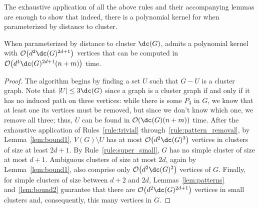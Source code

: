 The exhaustive application of all the above rules and their accompanying lemmas are enough to show that indeed, there is a polynomial kernel for  when parameterized by distance to cluster.


\begin{theorem}
    When parameterized by distance to cluster $\dc(G)$,  admits a polynomial kernel with $\bigO{d^2\dc(G)^{2d+1}}$ vertices that can be computed in $\bigO{d^4\dc(G)^{2d+1}(n+m)}$ time.
\end{theorem}

\begin{proof}
    The algorithm begins by finding a set $U$ such that $G - U$ is a cluster graph.
    Note that $|U| \leq 3\dc(G)$ since a graph is a cluster graph if and only if it has no induced path on three vertices: while there is some $P_3$ in $G$, we know that at least one its vertices must be removed, but since we don't know which one, we remove all three; thus, $U$ can be found in $\bigO{\dc(G)(n + m)}$ time.
    After the exhaustive application of Rules~\ref{rule:trivial} through~\ref{rule:pattern_removal}, by Lemma~\ref{lem:bound1}, $V(G) \setminus U$ has at most $\bigO{d^2\dc(G)^3}$ vertices in clusters of size at least $2d+1$.
    By Rule~\ref{rule:super_small}, $G$ has no simple cluster of size at most $d+1$.
    Ambiguous clusters of size at most $2d$, again by Lemma~\ref{lem:bound1}, also comprise only $\bigO{d^2\dc(G)^2}$ vertices of $G$.
    Finally, for simple clusters of size between $d+2$ and $2d$, Lemmas~\ref{lem:patterns} and~\ref{lem:bound2} guarantee that there are $\bigO{d^2\dc(G)^{2d+1}}$ vertices in small clusters and, consequently, this many vertices in $G$.


\end{proof}
